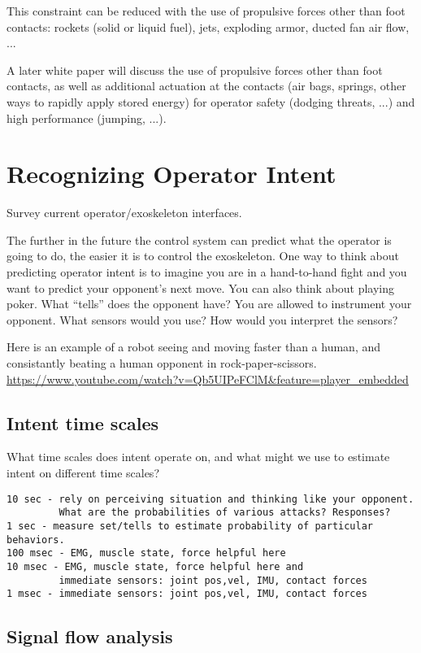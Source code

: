 \documentclass[letterpaper,12pt,fullpage]{article}
\begin{document}
This constraint can be reduced with the use of propulsive forces other
than foot contacts: rockets (solid or liquid fuel), jets, exploding armor,
ducted fan air flow, ...

A later white paper will discuss the use of propulsive forces other
than foot contacts, as well as additional actuation at the contacts (air
bags, springs, other ways to rapidly apply stored energy) for
operator safety (dodging threats, ...) and high performance (jumping, ...).

\section{Recognizing Operator Intent}

Survey current operator/exoskeleton interfaces.

The further in the future the control system can predict what the operator
is going to do, the easier it is to control the exoskeleton. One way
to think about predicting operator intent is to imagine you are in
a hand-to-hand fight and you want to predict your opponent's next move.
You can also think about playing poker. What ``tells'' does the opponent
have?
You are allowed to instrument your opponent. What sensors would you use?
How would you interpret the sensors?

Here is an example of a robot seeing and moving faster than a human, and
consistantly beating a human opponent in rock-paper-scissors.
\url{https://www.youtube.com/watch?v=Qb5UIPeFClM&feature=player_embedded}

\subsection{Intent time scales}

What time scales does intent operate on, and what might we use
to estimate intent on different time scales?

\begin{verbatim}
10 sec - rely on perceiving situation and thinking like your opponent.
         What are the probabilities of various attacks? Responses?
1 sec - measure set/tells to estimate probability of particular behaviors.
100 msec - EMG, muscle state, force helpful here
10 msec - EMG, muscle state, force helpful here and
         immediate sensors: joint pos,vel, IMU, contact forces
1 msec - immediate sensors: joint pos,vel, IMU, contact forces
\end{verbatim}

\subsection{Signal flow analysis}
\end{document}
